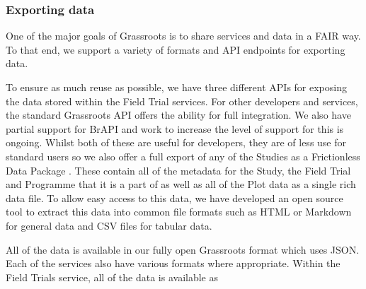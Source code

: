 \documentclass[12pt,a4paper]{extarticle}
\begin{document}
\subsubsection*{Exporting data}


One of the major goals of Grassroots is to share services and data in a FAIR\cite{fair_data} way. 
To that end, we support a variety of formats and API endpoints for exporting data.


To ensure as much reuse as possible, we have three different APIs for exposing the data stored within the Field Trial services. 
For other developers and services, the standard Grassroots API offers the ability for full integration. 
We also have partial support for BrAPI and work to increase the level of support for this is ongoing. 
Whilst both of these are useful for developers, they are of less use for standard users so we also offer a full export of any of the Studies as a Frictionless Data Package \cite {frictionless}. 
These contain all of the metadata for the Study, the Field Trial and Programme that it is a part of as well as all of the Plot data as a single rich data file. 
To allow easy access to this data, we have developed an open source tool \cite{grassroots_fd_tool} to extract this data into common file formats such as HTML or Markdown for general data and CSV files for tabular data. 



All of the data is available in our fully open Grassroots format which uses JSON.
Each of the services also have various formats where appropriate.
Within the Field Trials service, all of the data is available as 
\end{document}
